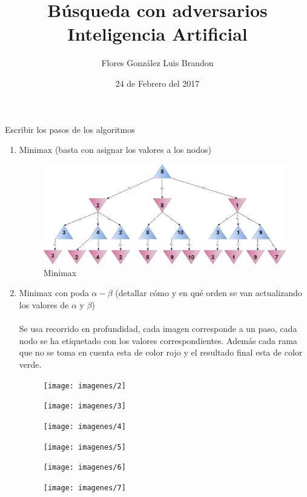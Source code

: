 \documentclass{article}
\title{Búsqueda con adversarios \\ Inteligencia Artificial}
\author{Flores González Luis Brandon}
\date{24 de Febrero del 2017}
\begin{document}
	\maketitle
	Escribir los pasos de los algoritmos
	
	\begin{enumerate}
		\item Minimax (basta con asignar los valores a los nodos)
			\begin{figure}[H]
				\centering
				\includegraphics[width=1\textwidth]{imagenes/Minimax}
				\caption{Minimax}
				\label{Minimax}
			\end{figure}
		\item Minimax con poda $\alpha - \beta$ (detallar cómo y en qué orden se van actualizando los valores de $\alpha$ y $\beta$)
		\\\\Se usa recorrido en profundidad, cada imagen corresponde a un paso, cada nodo se ha etiquetado con los valores correspondientes. Además cada rama que no se toma en cuenta esta de color rojo y el resultado final esta de color verde. 
			\begin{figure}[H]
				\centering
				\texttt{[image: imagenes/2]}
			\end{figure}
			\begin{figure}[H]
				\centering
				\texttt{[image: imagenes/3]}
			\end{figure}
			\begin{figure}[H]
				\centering
				\texttt{[image: imagenes/4]}
			\end{figure}
			\begin{figure}[H]
				\centering
				\texttt{[image: imagenes/5]}
			\end{figure}
			\begin{figure}[H]
				\centering
				\texttt{[image: imagenes/6]}
			\end{figure}
			\begin{figure}[H]
				\centering
				\texttt{[image: imagenes/7]}

\end{figure}
\end{enumerate}
\end{document}
